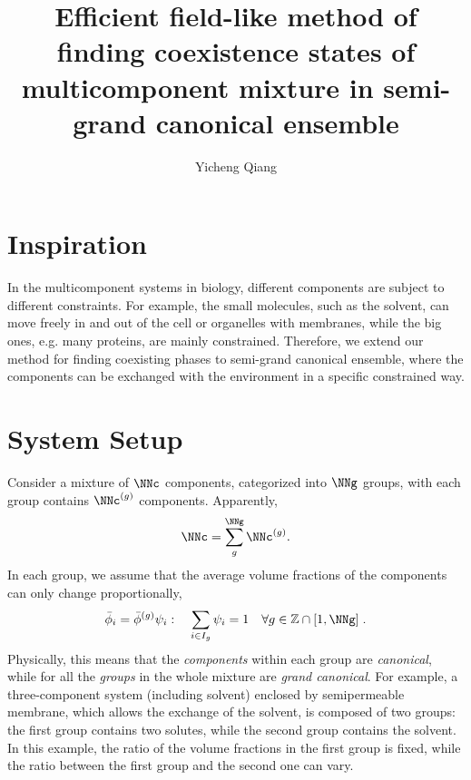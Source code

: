 \documentclass[aps,prl,reprint,onecolumn,groupedaddress,amsmath,amssymb]{revtex4-2}
\newcommand{\bphi}{{\bar{\phi}}}
\begin{document}
\title{Efficient field-like method of finding coexistence states of multicomponent mixture in semi-grand canonical ensemble}

\author{Yicheng Qiang}

\maketitle
\tableofcontents

\section{Inspiration}
In the multicomponent systems in biology, different components are subject to different constraints.
For example, the small molecules, such as the solvent, can move freely in and out of the cell or organelles with membranes, while the big ones, e.g. many proteins, are mainly constrained.
Therefore, we extend our method for finding coexisting phases to semi-grand canonical ensemble, where the components can be exchanged with the environment in a specific constrained way.

\section{System Setup}
Consider a mixture of $\NNc$ components, categorized into $\NNg$ groups, with each group contains $\NNc^{(g)}$ components.
Apparently,
\begin{align}
    \NNc = \sum_{g}^{\NNg} \NNc^{(g)}.
\end{align}
In each group, we assume that the average volume fractions of the components can only change proportionally,
\begin{align}
    \bphi_i = \bphi^{(g)} \psi_i:  \quad \sum_{i \in I_g} \psi_i = 1 \quad \forall g \in \mathbb{Z} \cap [1,\NNg] \;.
\end{align}
Physically, this means that the \emph{components} within each group are \emph{canonical}, while for all the \emph{groups} in the whole mixture are \emph{grand canonical}.
For example, a three-component system (including solvent) enclosed by semipermeable membrane, which allows the exchange of the solvent, is composed of two groups: the first group contains two solutes, while the second group contains the solvent.
In this example, the ratio of the volume fractions in the first group is fixed, while the ratio between the first group and the second one can vary.
\end{document}
